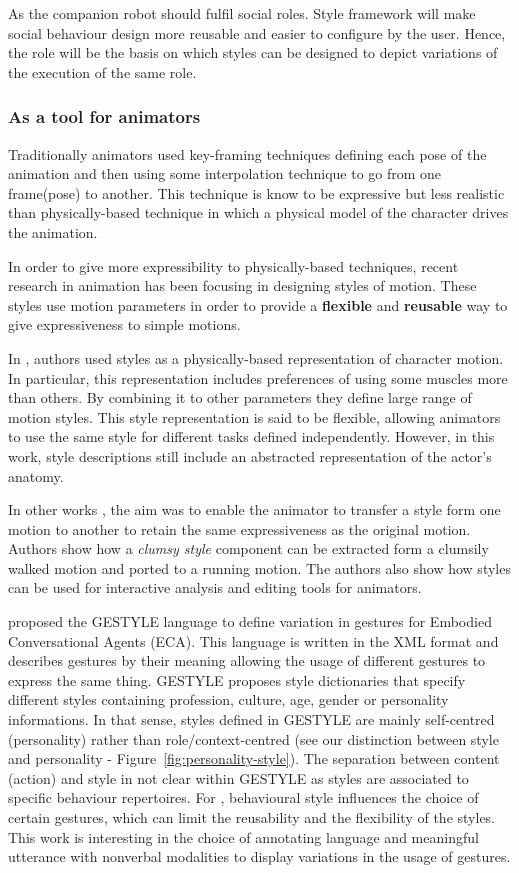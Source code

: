 \documentclass[smallextended]{svjour3}
\begin{document}
As the companion robot should fulfil social roles.
Style framework  will make social behaviour design more reusable and easier to configure by the user. 
Hence, the role will be the basis on which styles can be designed to depict variations of the execution of the same role. 


\subsubsection{As a tool for animators}
Traditionally animators used key-framing techniques defining each pose of the animation and then using some interpolation technique to go from one frame(pose) to another. 
This technique is know to be expressive but less realistic than physically-based technique in which a physical model of the character drives the animation.

In order to give more expressibility to physically-based techniques, recent research in animation has been focusing in designing styles of motion. 
These styles use motion parameters in order to provide a \textbf{flexible} and \textbf{reusable} way to give expressiveness to simple motions.

In \cite{Liu2005}, authors used styles as a physically-based representation of character motion. 
In particular, this representation includes preferences of using some muscles more than others.
By combining it to other parameters they define large range of motion styles.
This style representation is said to be flexible, allowing animators to use the same style for different tasks defined independently. However, in this work, style descriptions still include an abstracted representation of the actor's anatomy.

In other works \cite{shapiro2006style}, the aim was to enable the animator to transfer a style form one motion to another to retain the same expressiveness as the original motion.
Authors show how a\textit{ clumsy style} component can be extracted form a clumsily walked motion and ported to a running motion. 
The authors also show how styles can be used for interactive analysis and editing tools for animators.

\cite{Noot2004} proposed the GESTYLE language to define variation in gestures for Embodied Conversational Agents (ECA). 
This language is written in the XML format and describes gestures by their meaning allowing the usage of different gestures to express the same thing.
GESTYLE proposes style dictionaries that specify different styles containing profession, culture, age, gender or personality informations.
In that sense, styles defined in GESTYLE are mainly self-centred (personality) rather than role/context-centred (see our distinction between style and personality - Figure~\ref{fig:personality-style}). 
The separation between content (action) and style in not clear within GESTYLE as styles are associated to specific behaviour repertoires.
For \cite{Noot2004}, behavioural style influences the choice of certain gestures, which can limit the reusability and the flexibility of the styles.
This work is interesting in the choice of annotating language and meaningful utterance with nonverbal modalities to display variations in the usage of gestures.
\end{document}
